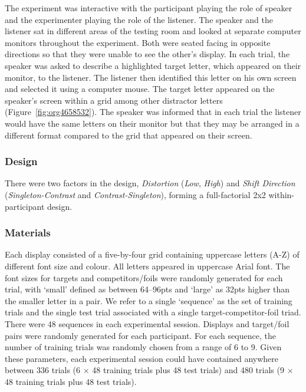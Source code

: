 \documentclass[natbib,doc,a4paper]{apa6}
\begin{document}
The experiment was interactive with the participant playing the role of speaker and the experimenter playing the role of the listener. The speaker and the listener sat in different areas of the testing room and looked at separate computer monitors throughout the experiment. Both were seated facing in opposite directions so that they were unable to see the other's display. In each trial, the speaker was asked to describe a highlighted target letter, which appeared on their monitor, to the listener. The listener then identified this letter on his own screen and selected it using a computer mouse. The target letter appeared on the speaker’s screen within a grid among other distractor letters (Figure~\ref{fig:org4658532}). The speaker was informed that in each trial the listener would have the same letters on their monitor but that they may be arranged in a different format compared to the grid that appeared on their screen.

\subsubsection*{Design}
\label{sec:orgc2597e4}

There were two factors in the design, \emph{Distortion} (\emph{Low}, \emph{High}) and \emph{Shift Direction} (\emph{Singleton-Contrast} and \emph{Contrast-Singleton}), forming a full-factorial 2x2 within-participant design.

\subsubsection*{Materials}
\label{sec:org79ea5cf}

Each display consisted of a five-by-four grid containing uppercase letters (A-Z) of different font size and colour. All letters appeared in uppercase Arial font. The font sizes for targets and competitors/foils were randomly generated for each trial, with `small' defined as between 64--96pts and `large' as 32pts higher than the smaller letter in a pair.  We refer to a single `sequence' as the set of training trials and the single test trial associated with a single target-competitor-foil triad. There were 48 sequences in each experimental session. Displays and target/foil pairs were randomly generated for each participant. For each sequence, the number of training trials was randomly chosen from a range of 6 to 9. Given these parameters, each experimental session could have contained anywhere between 336 trials (6 \(\times\) 48 training trials plus 48 test trials) and 480 trials (9 \(\times\) 48 training trials plus 48 test trials).  
\end{document}
